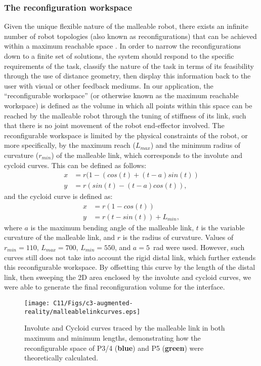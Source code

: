 \subsubsection{The reconfiguration workspace} \label{The reconfiguration workspace}
Given the unique flexible nature of the malleable robot, there exists an infinite number of robot topologies (also known as reconfigurations) that can be achieved within a maximum reachable space \cite{clark2021malleable}. In order to narrow the reconfigurations down to a finite set of solutions, the system should respond to the specific requirements of the task, classify the nature of the task in terms of its feasibility through the use of distance geometry, then display this information back to the user with visual or other feedback mediums. 
In our application, the “reconfigurable workspace” (or otherwise known as the maximum reachable workspace) is defined as the volume in which all points within this space can be reached by the malleable robot through the tuning of stiffness of its link, such that there is no joint movement of the robot end-effector involved. The reconfigurable workspace is limited by the physical constraints of the robot, or more specifically, by the maximum reach ($L_{max}$)  and the minimum radius of curvature ($r_{min}$) of the malleable link, which corresponds to the involute and cycloid curves. This can be defined as follows:
\small
\begin{align}
    x &= r(1-(cos(t)+(t-a)sin(t))\\
    y &= r(sin(t)-(t-a)cos(t)),
\end{align}
\normalsize
and the cycloid curve is defined as:
\small
\begin{align}
    x &= r(1-cos(t))\\
    y &= r(t-sin(t))+L_{min},
\end{align}
\normalsize
where $a$ is the maximum bending angle of the malleable link, $t$ is the variable curvature of the malleable link, and $r$ is the radius of curvature. Values of $r_{min}=110$, $L_{max}=700$, $L_{min}=550$, and $a=5$~rad were used.
However, such curves still does not take into account the rigid distal link, which further extends this reconfigurable workspace. By offsetting this curve by the length of the distal link, then sweeping the 2D area enclosed by the involute and cycloid curves, we were able to generate the final reconfiguration volume for the interface. 



\begin{figure}[t!]
    \centering
    \texttt{[image: C11/Figs/c3-augmented-reality/malleablelinkcurves.eps]}
    \caption{Involute and Cycloid curves traced by the malleable link in both maximum and minimum lengths, demonstrating how the reconfigurable space of P3/4 (\textbf{blue}) and P5 (\textbf{green}) were theoretically calculated.}
    \label{malleableLinkCurves}
\end{figure}


